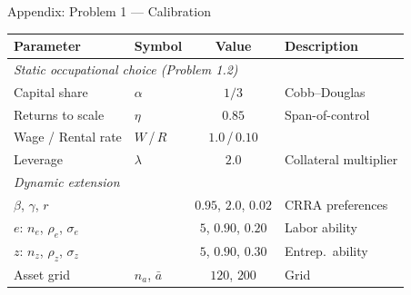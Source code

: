 \documentclass[aspectratio=169,11pt]{beamer}
\begin{document}
\begin{frame}{Appendix: Problem 1 --- Calibration}
    \footnotesize
    \begin{center}
    \begin{tabular}{llcl}
        \toprule
        \textbf{Parameter} & \textbf{Symbol} & \textbf{Value} & \textbf{Description} \\
        \midrule
        \multicolumn{4}{l}{\emph{Static occupational choice (Problem 1.2)}} \\
        Capital share & $\alpha$ & $1/3$ & Cobb--Douglas \\
        Returns to scale & $\eta$ & $0.85$ & Span-of-control \\
        Wage / Rental rate & $W$\,/\,$R$ & $1.0$\,/\,$0.10$ & \\
        Leverage & $\lambda$ & $2.0$ & Collateral multiplier \\
        \midrule
        \multicolumn{4}{l}{\emph{Dynamic extension}} \\
        $\beta$, $\gamma$, $r$ & & $0.95$, $2.0$, $0.02$ & CRRA preferences \\
        $e$: $n_e$, $\rho_e$, $\sigma_e$ & & $5$, $0.90$, $0.20$ & Labor ability \\
        $z$: $n_z$, $\rho_z$, $\sigma_z$ & & $5$, $0.90$, $0.30$ & Entrep.\ ability \\
        Asset grid & $n_a$, $\bar a$ & $120$, $200$ & Grid \\
        \bottomrule
    \end{tabular}
    \end{center}
\end{frame}
\end{document}
